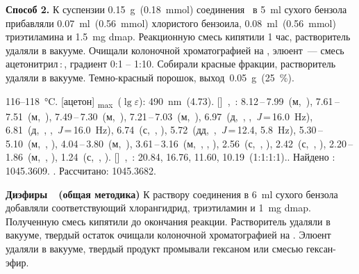 \textbf{Способ 2.} К суспензии \SI{0.15}{\gram}~(\SI{0.18}{\mmol}) соединения~\textbf{} в \SI{5}{\milli\litre} сухого бензола прибавляли \SI{0.07}{\milli\litre}~(\SI{0.56}{\mmol}) хлористого бензоила, \SI{0.08}{\milli\litre}~(\SI{0.56}{\mmol}) триэтиламина и \SI{1.5}{\milli\gram} \ac{dmap}.
Реакционную смесь кипятили 1 час, растворитель удаляли в вакууме.
Очищали колоночной хроматографией на , элюент~--- смесь ацетонитрил\,:\,, градиент 0:1 -- 1:10.
Собирали красные фракции, растворитель удаляли в вакууме. Темно-красный порошок, выход~\SI{0.05}{\gram}~(\SI{25}{\percent}).
\begin{experimental}
     116--\SI{118}{\celsius}.
    [ацетон] \chemlambda\textsubscript{max}~($\lg \varepsilon$): \SI{490}{\nano\metre}~(4.73).
    []~\chemdelta,~\si{\ppm}: 8.12\,--\,7.99~(м,~), 7.61\,--\,7.51~(м,~), 7.49\,--\,7.30~(м,~), 7.21\,--\,7.03~(м,~), 6.97~(д,~, ,~\textit{J}\,=\,16.0~\si{\hertz}), 6.81~(д,~, ,~\textit{J}\,=\,16.0~\si{\hertz}), 6.74~(с,~, ), 5.72~(дд,~,~\textit{J}\,=\,12.4, 5.8~\si{\hertz}), 5.30\,--\,5.10~(м,~, ), 4.04\,--\,3.80~(м,~), 3.61\,--\,3.16~(м,~, , ), 2.56~(с,~, ), 2.42~(с,~, ), 2.20\,--\,1.86~(м,~, ), 1.24~(с,~, ).
    []~\chemdelta,~\si{\ppm}: 20.84, 16.76, 11.60, 10.19~(1:1:1:1)..
     Найдено \ce{[M + H]+}: \num{1045.3609}. . Рассчитано: \ce{[M + H]} \num{1045.3682}.
\end{experimental}

\textbf{Диэфиры~~(общая методика)}
К раствору соединения  в \SI{6}{\milli\litre} сухого бензола добавляли соответствующий хлорангидрид, триэтиламин и \SI{1}{\milli\gram} \ac{dmap}.
Полученную смесь кипятили до окончания реакции.
Растворитель удаляли в вакууме, твердый остаток очищали колоночной хроматографией на .
Элюент удаляли в вакууме, твердый продукт промывали гексаном или смесью гексан-эфир.

